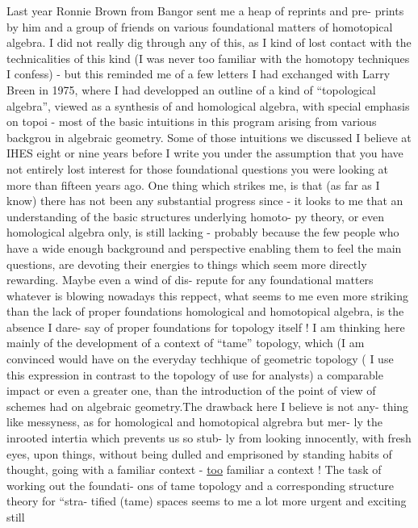  Last year Ronnie Brown from Bangor sent me a heap of reprints and pre-%
prints by him and a group of friends\hand{,} on various foundational matters of
homotopical algebra. I did not really dig through any of this, as I kind of
lost contact with the technicalities of this kind (I was never too familiar
with the homotopy techniques\hand{/} I confess) - but this reminded me of a few
letters I had exchanged with Larry Breen in 1975, where I had developped
an outline of a  kind of ``topological algebra'', viewed as a synthesis of
 and homological algebra, with special emphasis on topoi -
most of the basic intuitions in this program arising from various backgrou
in algebraic geometry. \hand{\unsure{(}}Some of those intuitions we discussed\hand{,} I believe\hand{,}
at IHES eight or nine years before\hand{,}  \hand{/} I write you under the assumption that you have not
entirely lost interest for those foundational questions you were looking at
more than fifteen years ago. One thing which strikes me, is that (as far
as I know) there has not been any substantial progress since - it looks
to me that an understanding of the basic structures underlying homoto-%
py theory, or even homological algebra only, is still lacking - probably
because the few people who have a wide enough background and perspective
enabling them to feel the main questions, are devoting their energies to
things which seem more directly rewarding. Maybe  even a wind of dis-%
repute for any foundational matters whatever is blowing nowadays \xout{\unsure{!}}
this reppect, what seems to me even more striking than the lack of proper
foundations  homological and homotopical algebra, is the absence I dare-%
say of proper foundations for topology itself ! I am thinking here mainly
of the development of a context of ``tame'' topology, which (I am convinced\hand{)}
would have on the everyday techhique of geometric topology ( I use this
expression in contrast to the topology of use for analysts) a comparable
impact or even a greater one, than the introduction of the point of view of
schemes had on algebraic geometry.The  drawback here I believe is not any-%
thing like messyness, as for homological and homotopical algrebra\hand{,} but mer-%
\margin{-}ly the inrooted intertia which  prevents  us so stub-%
ly from looking innocently, with fresh eyes, upon things, without being
dulled and emprisoned by standing habits of thought, going with a familiar
context - \uline{too} familiar a context ! The task of working out the foundati-%
ons of tame topology\hand{,} and a  corresponding structure theory for ``stra-%
tified (tame) spaces\hand{,} seems to me a lot more urgent and exciting still  


